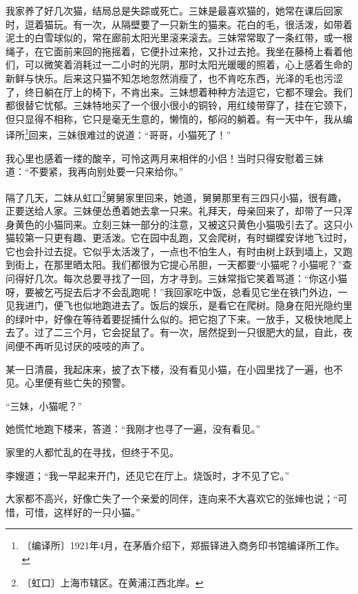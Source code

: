 \documentclass[12pt,UTF-8,openany]{ctexbook}
\begin{document}
\begin{large}
    
    我家养了好几次猫，结局总是失踪或死亡。三妹是最喜欢猫的，她常在课后回家时，逗着猫玩。有一次，从隔壁要了一只新生的猫来。花白的毛，很活泼，如带着泥土的白雪球似的，常在廊前太阳光里滚来滚去。三妹常常取了一条红带，或一根绳子，在它面前来回的拖摇着，它便扑过来抢，又扑过去抢。我坐在藤椅上看着他们，可以微笑着消耗过一二小时的光阴，那时太阳光暖暖的照着，心上感着生命的新鲜与快乐。后来这只猫不知怎地忽然消瘦了，也不肯吃东西，光泽的毛也污涩了，终日躺在厅上的椅下，不肯出来。三妹想着种种方法逗它，它都不理会。我们都很替它忧郁。三妹特地买了一个很小很小的铜铃，用红绫带穿了，挂在它颈下，但只显得不相称，它只是毫无生意的，懒惰的，郁闷的躺着。有一天中午，我从编译所\footnote{〔编译所〕1921年4月，在茅盾介绍下，郑振铎进入商务印书馆编译所工作。}回来，三妹很难过的说道：“哥哥，小猫死了！”
    
    我心里也感着一缕的酸辛，可怜这两月来相伴的小侣！当时只得安慰着三妹道：“不要紧，我再向别处要一只来给你。”
    
    隔了几天，二妹从虹口\footnote{〔虹口〕上海市辖区。在黄浦江西北岸。}舅舅家里回来，她道，舅舅那里有三四只小猫，很有趣，正要送给人家。三妹便怂恿着她去拿一只来。礼拜天，母亲回来了，却带了一只浑身黄色的小猫同来。立刻三妹一部分的注意，又被这只黄色小猫吸引去了。这只小猫较第一只更有趣、更活泼。它在园中乱跑，又会爬树，有时蝴蝶安详地飞过时，它也会扑过去捉。它似乎太活泼了，一点也不怕生人，有时由树上跃到墙上，又跑到街上，在那里晒太阳。我们都很为它提心吊胆，一天都要“小猫呢？小猫呢？”查问得好几次。每次总要寻找了一回，方才寻到。三妹常指它笑着骂道：“你这小猫呀，要被乞丐捉去后才不会乱跑呢！”我回家吃中饭，总看见它坐在铁门外边，一见我进门，便飞也似地跑进去了。饭后的娱乐，是看它在爬树。隐身在阳光隐约里的绿叶中，好像在等待着要捉捕什么似的。把它抱了下来。一放手，又极快地爬上去了。过了二三个月，它会捉鼠了。有一次，居然捉到一只很肥大的鼠，自此，夜间便不再听见讨厌的吱吱的声了。
    
    某一日清晨，我起床来，披了衣下楼，没有看见小猫，在小园里找了一遍，也不见。心里便有些亡失的预警。
    
    “三妹，小猫呢？”
    
    她慌忙地跑下楼来，答道：“我刚才也寻了一遍，没有看见。”
    
    家里的人都忙乱的在寻找，但终于不见。
    
    李嫂道；“我一早起来开门，还见它在厅上。烧饭时，才不见了它。”
    
    大家都不高兴，好像亡失了一个亲爱的同伴，连向来不大喜欢它的张婶也说；“可惜，可惜，这样好的一只小猫。”
    

\end{large}
\end{document}
